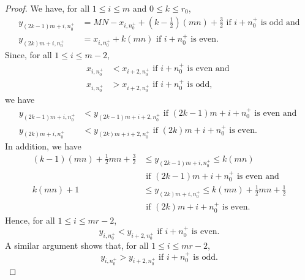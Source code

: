 \documentclass[12pt]{amsart}
\theoremstyle{definition}
\theoremstyle{plain}
\begin{document}
\begin{proof}
   We have,
   for all $1 \leqslant i \leqslant m$ and $0 \leqslant k \leqslant r_0$,
  \begin{align*}
   y_{(2k-1)m+i,n^{+}_0} &= MN - x_{i,n^{+}_0} +(k-\tfrac{1}{2})(mn) +\tfrac{3}{2} \mbox{ \ if } i+n^{+}_0 \mbox{ is odd and} \\
   y_{(2k)m+i,n^{+}_0} &= x_{i,n^{+}_0} +k(mn) \mbox{ \ if } i+n^{+}_0 \mbox{ is even.}
  \end{align*}
   Since, for all  $1 \leqslant i \leqslant m-2$,
   \begin{align*}
    x_{i,n_0^{+}} &<  x_{i+2,n_0^{+}} \mbox{ \ if } i+ n^{+}_0 \mbox{ is even and }    \\
    x_{i,n_0^{+}} &>  x_{i+2,n_0^{+}} \mbox{ \ if } i+ n^{+}_0 \mbox{ is odd,}
  \end{align*}
   we have
   \begin{align*}
    y_{(2k-1)m+i,n_0^{+}} &<  y_{(2k-1)m+i+2,n_0^{+}} \mbox{ \ if }  (2k-1)m+i+ n^{+}_0 \mbox{ is even and }  \\
    y_{(2k)m+i,n_0^{+}} &<  y_{(2k)m+i+2,n_0^{+}} \mbox{ \ if } (2k)m+i+ n^{+}_0 \mbox{ is even.}
  \end{align*}
   In addition, we have
   \begin{align*}
     (k-1)(mn) +\tfrac{1}{2}mn +\tfrac{3}{2} &\leqslant y_{(2k-1)m+i,n^{+}_0} \leqslant k(mn) \\
     &\mbox{ \ if } (2k-1)m+i+n^{+}_0 \mbox{ is even and } \\
     k(mn) + 1 &\leqslant y_{(2k)m+i,n^{+}_0} \leqslant k(mn) +\tfrac{1}{2}mn +\tfrac{1}{2}  \\
     &\mbox{ \ if } (2k)m+i+n^{+}_0 \mbox{ is even.}
   \end{align*}
   Hence, for all $1 \leqslant i \leqslant mr-2$,
   \begin{equation*}
      y_{i,n_0^{+}} <  y_{i+2,n_0^{+}} \mbox{ \ if } i+ n^{+}_0 \mbox{ is even.}
   \end{equation*}
   A similar argument shows that, for all $1 \leqslant i \leqslant mr-2$,
   \begin{equation*}
      y_{i,n_0^{+}} >  y_{i+2,n_0^{+}} \mbox{ \ if } i+ n^{+}_0 \mbox{ is odd.}
   \end{equation*}


\end{proof}
\end{document}
